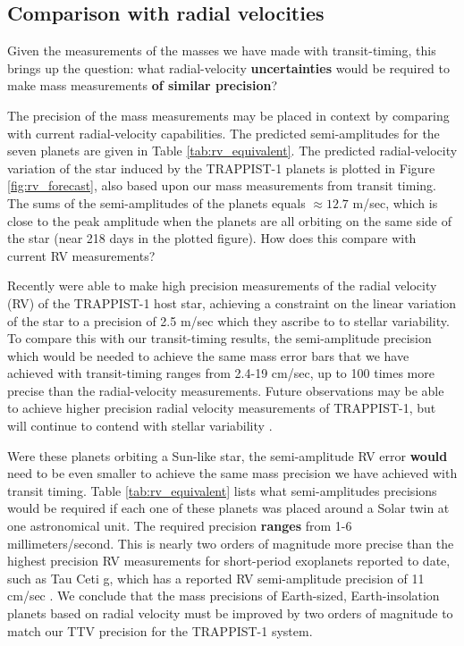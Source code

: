 \documentclass[twocolumn]{aastex63}
\begin{document}
\subsection{Comparison with radial velocities}

Given the measurements of the masses we have made with transit-timing,
this brings up the question:  what radial-velocity \textbf{uncertainties} would be
required to make mass measurements \textbf{of similar precision}?

The precision of the mass measurements may be placed in
context by comparing with current radial-velocity capabilities.
The predicted semi-amplitudes for the seven planets are given
in Table \ref{tab:rv_equivalent}.
The predicted radial-velocity variation of the star induced by the TRAPPIST-1
planets is plotted in Figure \ref{fig:rv_forecast}, also based upon our
mass measurements from transit timing.  The sums of the semi-amplitudes
of the planets equals ${\approx}12.7$ m/sec, which is close to the
peak amplitude when the planets are all orbiting on the same side of
the star (near 218 days in the plotted figure).  How does this compare
with current RV measurements?

Recently \citet{Hirano2020} were able to make high precision
measurements of the radial velocity (RV) of the TRAPPIST-1 host star,
achieving a constraint on the linear variation of the star to
a precision of 2.5 m/sec which they ascribe to
to stellar variability.  To compare this with our
transit-timing results, the semi-amplitude precision
which would be needed to achieve the same mass error bars that
we have achieved with transit-timing ranges from 2.4-19 cm/sec,
up to 100 times more precise than the radial-velocity measurements.
Future observations may be able to achieve higher precision radial
velocity measurements of TRAPPIST-1, but will continue to contend with stellar
variability \citep{Klein2019}.

Were these planets orbiting a Sun-like star, the semi-amplitude RV error \textbf{would}
need to be even smaller to achieve
the same mass precision we have achieved with transit timing.
Table \ref{tab:rv_equivalent} lists what semi-amplitudes precisions
would be required if each one of these planets was placed around a
Solar twin at one astronomical unit.  The required precision \textbf{ranges}
from 1-6 millimeters/second.  This is nearly two orders of magnitude
more precise than the highest precision RV measurements
for short-period exoplanets reported to date, such as Tau Ceti g,
which has a reported RV semi-amplitude precision of 11 cm/sec \citep{Feng2017}.
We conclude that the mass precisions of Earth-sized, Earth-insolation
planets based on radial velocity must be improved by two orders
of magnitude to match our TTV precision for the TRAPPIST-1 system.
\end{document}
